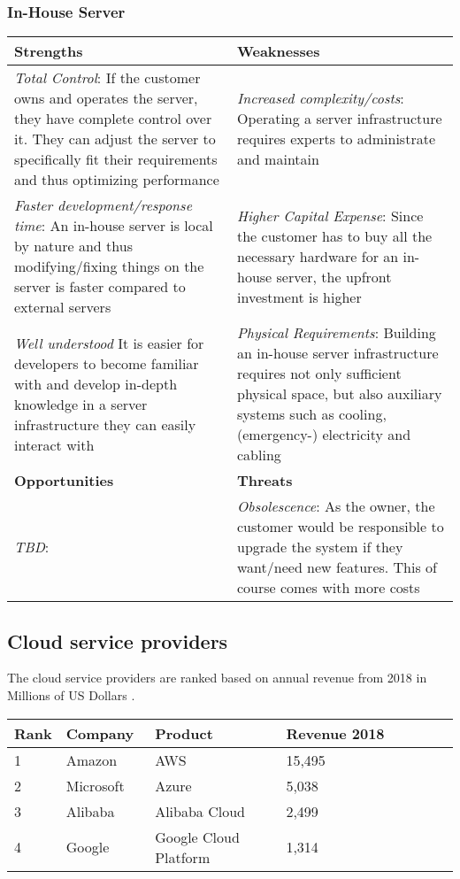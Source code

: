 \subsubsection{In-House Server}

\begin{center}
\begin{tabular}{ | p{0.5\linewidth} | p{0.5\linewidth} | } 
 \hline
 \textbf{Strengths} & \textbf{Weaknesses}\\ 
\hline
 \textit{Total Control}: If the customer owns and operates the server, they have complete control over it. They can adjust the server to specifically fit their requirements and thus optimizing performance & \textit{Increased complexity/costs}: Operating a server infrastructure requires experts to administrate and maintain \\ 
\textit{Faster development/response time}: An in-house server is local by nature and thus modifying/fixing things on the server is faster compared to external servers & \textit{Higher Capital Expense}: Since the customer has to buy all the necessary hardware for an in-house server, the upfront investment is higher \\
\textit{Well understood} It is easier for developers to become familiar with and develop in-depth knowledge in a server infrastructure they can easily interact with & \textit{Physical Requirements}: Building an in-house server infrastructure requires not only sufficient physical space, but also auxiliary systems such as cooling, (emergency-) electricity and cabling \\
 \hline
 \textbf{Opportunities} & \textbf{Threats}  \\ 
 \hline
\textit{TBD}: & \textit{Obsolescence}: As the owner, the customer would be responsible to upgrade the system if they want/need new features. This of course comes with more costs \\
\hline 
\end{tabular}
\end{center}

\subsection{Cloud service providers}
The cloud service providers are ranked based on annual revenue from 2018 in Millions of US Dollars \parencite{iaasrevenue}.
\begin{center}
\begin{tabular}{ | p{0.1\linewidth} | p{0.2\linewidth} | p{0.3\linewidth} | p{0.4\linewidth} |} 
\hline
\textbf{Rank} & \textbf{Company} & \textbf{Product} & \textbf{Revenue 2018} \\ 
\hline
1 & Amazon & AWS & 15,495\\
\hline
2 & Microsoft & Azure & 5,038 \\
\hline
3 & Alibaba & Alibaba Cloud & 2,499 \\
\hline
4 & Google & Google Cloud Platform & 1,314\\
\hline
\end{tabular}
\end{center}